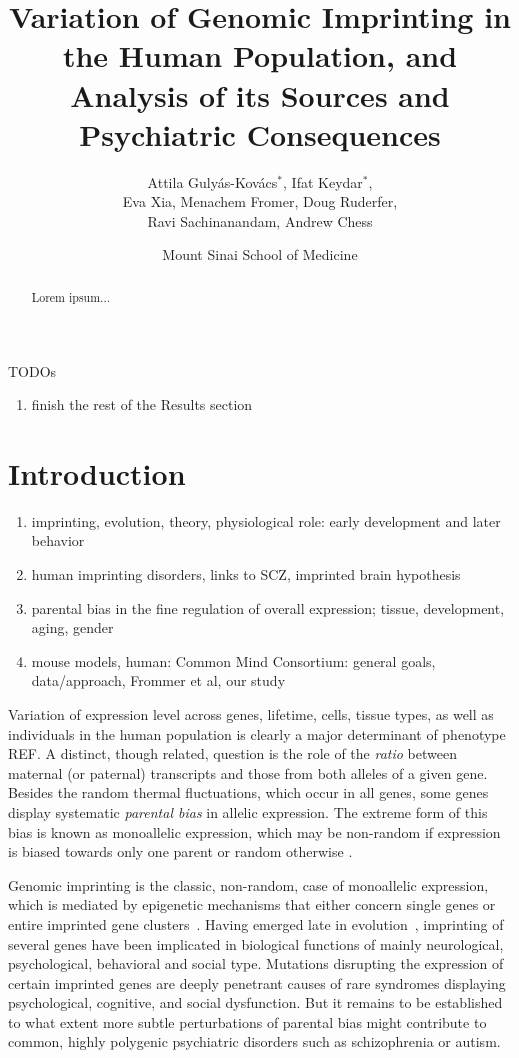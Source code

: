 \documentclass[letterpaper]{article}
\title{Variation of Genomic Imprinting in the Human Population,
and Analysis of its Sources and Psychiatric Consequences}
\author{Attila Guly\'{a}s-Kov\'{a}cs\(^\ast\), Ifat Keydar\(^\ast\),\\
Eva Xia, Menachem Fromer, Doug Ruderfer,\\
Ravi Sachinanandam, Andrew Chess}
\date{Mount Sinai School of Medicine}
\begin{document}
\maketitle

TODOs
\begin{enumerate}
\item finish the rest of the Results section
\end{enumerate}

\newpage

\maketitle

\begin{abstract}
Lorem ipsum...
\end{abstract}

\section{Introduction}

\begin{enumerate}
\item imprinting, evolution, theory, physiological role: early development and
later behavior
\item human imprinting disorders, links to SCZ, imprinted brain hypothesis
\item parental bias in the fine regulation of overall expression; tissue,
development, aging, gender
\item mouse models, human: Common Mind Consortium: general goals, data/approach, Frommer et al,
our study
\end{enumerate}

Variation of expression level across genes, lifetime, cells, tissue types, as
well as individuals in the human population is clearly a major determinant of
phenotype REF.  A distinct, though related, question is the role of the
\emph{ratio} between maternal (or paternal) transcripts and those from both
alleles of a given gene.  Besides the random thermal fluctuations, which occur
in all genes, some genes display systematic \emph{parental bias} in allelic
expression.  The extreme form of this bias is known as monoallelic expression,
which may be non-random if expression is biased towards only one parent or
random otherwise \cite{Chess2012}.

Genomic imprinting is the classic, non-random, case of monoallelic expression,
which is mediated by epigenetic mechanisms that either concern single genes or
entire imprinted gene clusters~\cite{Peters2014,Plasschaert2014}.  Having
emerged late in evolution~\cite{Tucci2016}, imprinting of several genes have
been implicated in biological functions of mainly neurological, psychological,
behavioral and social type.  Mutations disrupting the expression of certain
imprinted genes are deeply penetrant causes of rare syndromes displaying
psychological, cognitive, and social dysfunction.  But it remains to be
established to what extent more subtle perturbations of parental bias might
contribute to common, highly polygenic psychiatric disorders such as
schizophrenia or autism.
\end{document}
